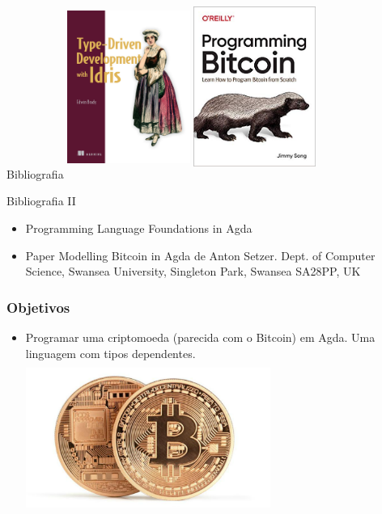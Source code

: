 \documentclass{beamer}
\begin{document}
 \begin{frame}{Bibliografia}
    \includegraphics[width=4cm, height=6cm]{TDD}
    \includegraphics[width=4cm, height=6cm]{ProgrammingBitcoin.jpg}
 \end{frame}
 
 \begin{frame}{Bibliografia II}
    \begin{itemize}
        \item Programming Language Foundations in Agda
        \item Paper Modelling Bitcoin in Agda de Anton Setzer.
        Dept. of Computer Science, Swansea University, Singleton Park, Swansea SA28PP, UK
    \end{itemize}
 \end{frame}
 
 \begin{frame}
\frametitle{Objetivos}
\begin{itemize}
    \item Programar uma criptomoeda (parecida com o Bitcoin) em Agda. Uma linguagem com tipos dependentes.
    \includegraphics[width=8cm, height=5cm]{TwoBitcoins}
\end{itemize}
\end{frame}
\end{document}
